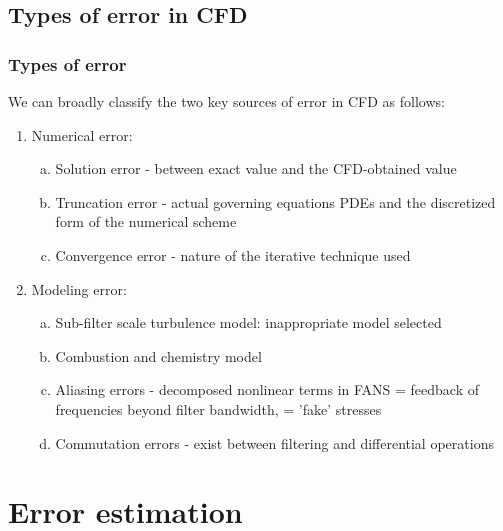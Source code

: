 \documentclass{beamer}
\begin{document}
\subsection{Types of error in CFD}
\begin{frame}%
\frametitle{Types of error}
\scriptsize
We can broadly classify the two key sources of error in CFD as follows:

\begin{enumerate}[1.]
\item Numerical error:
	\begin{enumerate}[(a)]
	\scriptsize
	\item Solution error - between exact value and the CFD-obtained value
	\item Truncation error - actual governing equations PDEs and the discretized form of the numerical scheme
	\item Convergence error - nature of the iterative technique used
	\end{enumerate}
\item Modeling error:
	\begin{enumerate}[(a)]
	\scriptsize
	\item Sub-filter scale turbulence model: inappropriate model selected
	\item Combustion and chemistry model
	\item Aliasing errors - decomposed nonlinear terms in FANS = feedback of frequencies beyond filter bandwidth, = 'fake' stresses 
	\item Commutation errors - exist between filtering and differential operations 
	\end{enumerate}
\end{enumerate}

\end{frame}





\section[Error estimates]{Error estimation}
\end{document}
